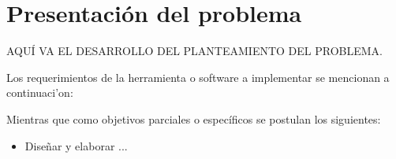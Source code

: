\chapter{Presentación del problema}\label{chapter:presentacion_del_problema}

AQU\'I VA EL DESARROLLO DEL PLANTEAMIENTO DEL PROBLEMA.

Los requerimientos de la herramienta o software a implementar se mencionan a
continuaci'on: 

\label{sect:objetivos}
Mientras que como objetivos parciales o específicos se postulan los siguientes:
\begin{itemize}
\item {Diseñar y elaborar ...}
\end{itemize}
